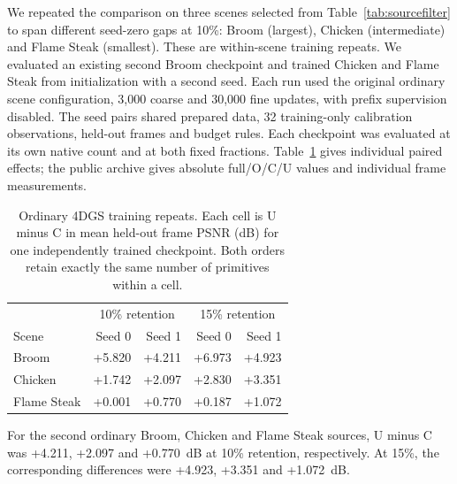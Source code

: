 We repeated the comparison on three scenes selected from Table~\ref{tab:sourcefilter} to span different seed-zero gaps at 10\%: Broom (largest), Chicken (intermediate) and Flame Steak (smallest). These are within-scene training repeats. We evaluated an existing second Broom checkpoint and trained Chicken and Flame Steak from initialization with a second seed. Each run used the original ordinary scene configuration, 3,000 coarse and 30,000 fine updates, with prefix supervision disabled. The seed pairs shared prepared data, 32 training-only calibration observations, held-out frames and budget rules. Each checkpoint was evaluated at its own native count and at both fixed fractions. Table~\ref{tab:ordrep} gives individual paired effects; the public archive gives absolute full/O/C/U values and individual frame measurements.

\begin{table}[!htbp]\centering\small
\caption{Ordinary 4DGS training repeats. Each cell is U minus C in mean held-out frame PSNR (dB) for one independently trained checkpoint. Both orders retain exactly the same number of primitives within a cell.}\label{tab:ordrep}
\begin{tabular}{lrrrr}\toprule
 & \multicolumn{2}{c}{10\% retention} & \multicolumn{2}{c}{15\% retention}\\
Scene & Seed 0 & Seed 1 & Seed 0 & Seed 1 \\\midrule
Broom & +5.820 & +4.211 & +6.973 & +4.923 \\
Chicken & +1.742 & +2.097 & +2.830 & +3.351 \\
Flame Steak & +0.001 & +0.770 & +0.187 & +1.072 \\
\bottomrule\end{tabular}\end{table}
For the second ordinary Broom, Chicken and Flame Steak sources, U minus C was +4.211, +2.097 and +0.770~dB at 10\% retention, respectively. At 15\%, the corresponding differences were +4.923, +3.351 and +1.072~dB.
